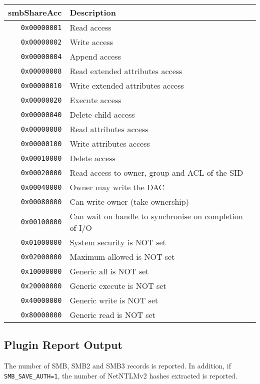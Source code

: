 \documentclass[documentation]{subfiles}
\begin{document}
\begin{longtable}{rl}
    \toprule
    {\bf smbShareAcc} & {\bf Description}\\
    \midrule\endhead%
    {\tt 0x00000001} & Read access\\
    {\tt 0x00000002} & Write access\\
    {\tt 0x00000004} & Append access\\
    {\tt 0x00000008} & Read extended attributes access\\
    {\tt 0x00000010} & Write extended attributes access\\
    {\tt 0x00000020} & Execute access\\
    {\tt 0x00000040} & Delete child access\\
    {\tt 0x00000080} & Read attributes access\\
    {\tt 0x00000100} & Write attributes access\\
    {\tt 0x00010000} & Delete access\\
    {\tt 0x00020000} & Read access to owner, group and ACL of the SID\\
    {\tt 0x00040000} & Owner may write the DAC\\
    {\tt 0x00080000} & Can write owner (take ownership)\\
    {\tt 0x00100000} & Can wait on handle to synchronise on completion of I/O\\
    {\tt 0x01000000} & System security is NOT set\\
    {\tt 0x02000000} & Maximum allowed is NOT set\\
    {\tt 0x10000000} & Generic all is NOT set\\
    {\tt 0x20000000} & Generic execute is NOT set\\
    {\tt 0x40000000} & Generic write is NOT set\\
    {\tt 0x80000000} & Generic read is NOT set\\
    \bottomrule
\end{longtable}


\subsection{Plugin Report Output}
The number of SMB, SMB2 and SMB3 records is reported.
In addition, if {\tt SMB\_SAVE\_AUTH=1}, the number of NetNTLMv2 hashes extracted is reported.
\end{document}
